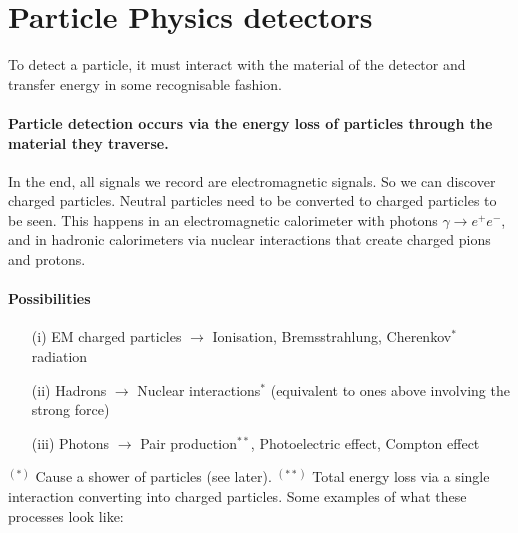 \section{Particle Physics detectors}

To detect a particle, it must interact with the material of the detector and transfer energy in some recognisable fashion.
\paragraph{Particle detection occurs via the energy loss of particles through the material they traverse.} In the end, all signals we record are electromagnetic signals. So we can discover charged particles. Neutral particles need to be converted to charged particles to be seen. This happens in an electromagnetic calorimeter with photons $\gamma \to e^+ e^-$, and in hadronic calorimeters via nuclear interactions that create charged pions and protons.

\paragraph{Possibilities}
\begin{itemize}
\item[(i)] EM charged particles $\rightarrow$ Ionisation, Bremsstrahlung, Cherenkov$^*$ radiation
\item[(ii)] Hadrons $\rightarrow$ Nuclear interactions$^*$ (equivalent to ones above involving the strong force)
\item[(iii)] Photons $\rightarrow$ Pair production$^{**}$, Photoelectric effect, Compton effect
\end{itemize}
$^{(*)}$ Cause a shower of particles (see later).\newline
$^{(**)}$ Total energy loss via a single interaction converting into charged particles.\newline
Some examples of what these processes look like:

